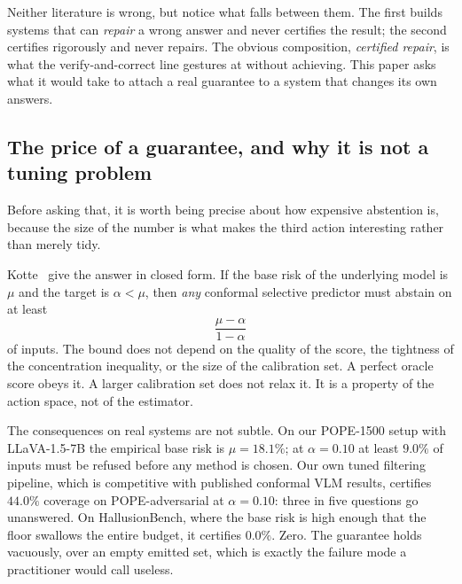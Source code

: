 \documentclass[review,number,doubleblind]{elsarticle}
\theoremstyle{plain}
\theoremstyle{definition}
\theoremstyle{remark}
\begin{document}
Neither literature is wrong, but notice what falls between them. The first builds systems
that can \emph{repair} a wrong answer and never certifies the result; the second certifies
rigorously and never repairs. The obvious composition, \emph{certified repair}, is what the
verify-and-correct line \citep{woodpecker,lure,cmvkgguard} gestures at without achieving.
This paper asks what it would take to attach a real guarantee to a system that changes its
own answers.

\subsection{The price of a guarantee, and why it is not a tuning problem}

Before asking that, it is worth being precise about how expensive abstention is, because
the size of the number is what makes the third action interesting rather than merely
tidy.

Kotte~\cite{crcimposs} give the answer in closed form. If the base risk of the underlying model
is $\mu$ and the target is $\alpha<\mu$, then \emph{any} conformal selective predictor must
abstain on at least
\[
  \frac{\mu-\alpha}{1-\alpha}
\]
of inputs. The bound does not depend on the quality of the score, the
tightness of the concentration inequality, or the size of the calibration set. A perfect
oracle score obeys it. A larger calibration set does not relax it. It is a property of the
action space, not of the estimator.

The consequences on real systems are not subtle. On our POPE-1500 setup with LLaVA-1.5-7B
the empirical base risk is $\mu=18.1\%$; at $\alpha=0.10$ at least $9.0\%$ of inputs must be
refused before any method is chosen. Our own tuned filtering pipeline, which is competitive
with published conformal VLM results, certifies $44.0\%$ coverage on POPE-adversarial at
$\alpha=0.10$: three in five questions go unanswered. On HallusionBench, where the base risk
is high enough that the floor swallows the entire budget, it certifies $0.0\%$. Zero. The
guarantee holds vacuously, over an empty emitted set, which is exactly the failure mode a
practitioner would call useless.
\end{document}
